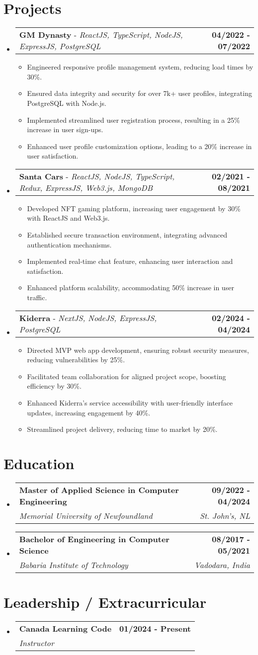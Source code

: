 \documentclass[letterpaper,11pt]{article}
\makeatletter
\newcommand{\resumeItem}[1]{
  \item\small{
    {#1 \vspace{-2pt}}
  }
}
\newcommand{\resumeSubheading}[4]{
  \vspace{-2pt}\item
    \begin{tabular*}{1.0\textwidth}[t]{l@{\extracolsep{\fill}}r}
      \textbf{#1} & \textbf{\small #2} \\
      \textit{\small#3} & \textit{\small #4} \\
    \end{tabular*}\vspace{-7pt}
}
\newcommand{\resumeProjectHeading}[2]{
    \item
    \begin{tabular*}{1.001\textwidth}{l@{\extracolsep{\fill}}r}
      \small#1 & \textbf{\small #2}\\
    \end{tabular*}\vspace{-7pt}
}
\newcommand{\resumeSubHeadingListStart}{\begin{itemize}[leftmargin=0.0in, label={}]}
\newcommand{\resumeSubHeadingListEnd}{\end{itemize}}
\newcommand{\resumeItemListStart}{\begin{itemize}}
\newcommand{\resumeItemListEnd}{\end{itemize}\vspace{-5pt}}
\makeatother
\begin{document}
\section{Projects}
  \resumeSubHeadingListStart
    \resumeProjectHeading
        {\textbf{GM Dynasty} - \emph{ReactJS, TypeScript, NodeJS, ExpressJS, PostgreSQL}}{04/2022 - 07/2022}
        \resumeItemListStart
          \resumeItem{Engineered responsive profile management system, reducing load times by 30\%.}
          \resumeItem{Ensured data integrity and security for over 7k+ user profiles, integrating PostgreSQL with Node.js.}
          \resumeItem{Implemented streamlined user registration process, resulting in a 25\% increase in user sign-ups.}
          \resumeItem{Enhanced user profile customization options, leading to a 20\% increase in user satisfaction.}
        \resumeItemListEnd
        \vspace{-16pt}
    \resumeProjectHeading
        {\textbf{Santa Cars} - \emph{ReactJS, NodeJS, TypeScript, Redux, ExpressJS, Web3.js, MongoDB}}{02/2021 - 08/2021}
        \resumeItemListStart
          \resumeItem{Developed NFT gaming platform, increasing user engagement by 30\% with ReactJS and Web3.js.}
          \resumeItem{Established secure transaction environment, integrating advanced authentication mechanisms.}
          \resumeItem{Implemented real-time chat feature, enhancing user interaction and satisfaction.}
          \resumeItem{Enhanced platform scalability, accommodating 50\% increase in user traffic.}
        \resumeItemListEnd
                \vspace{-16pt}
    \resumeProjectHeading
        {\textbf{Kiderra} - \emph{NextJS, NodeJS, ExpressJS, PostgreSQL}}{02/2024 - 04/2024}
        \resumeItemListStart
          \resumeItem{Directed MVP web app development, ensuring robust security measures, reducing vulnerabilities by 25\%.}
          \resumeItem{Facilitated team collaboration for aligned project scope, boosting efficiency by 30\%.}
          \resumeItem{Enhanced Kiderra's service accessibility with user-friendly interface updates, increasing engagement by 40\%.}
          \resumeItem{Streamlined project delivery, reducing time to market by 20\%.}
        \resumeItemListEnd
  \resumeSubHeadingListEnd
\vspace{-15pt}

\section{Education}
\resumeSubHeadingListStart
\resumeSubheading
{Master of Applied Science in Computer Engineering}{09/2022 - 04/2024}
{Memorial University of Newfoundland}{St. John's, NL}
\resumeSubheading
{Bachelor of Engineering in Computer Science}{08/2017 - 05/2021}
{Babaria Institute of Technology}{Vadodara, India}
\resumeSubHeadingListEnd
\section{Leadership / Extracurricular}
    \resumeSubHeadingListStart
        \resumeSubheading{Canada Learning Code}{01/2024 - Present}{Instructor}{}
    \resumeSubHeadingListEnd
\end{document}
